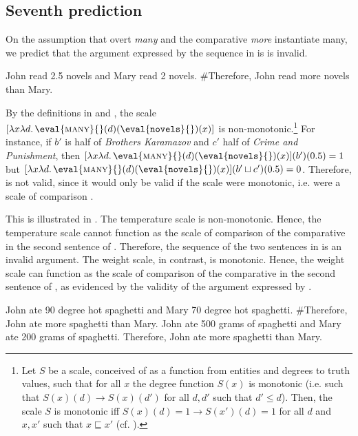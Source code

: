 \documentclass[output=paper]{langscibook}
\begin{document}
\subsection{Seventh prediction} 

On the assumption that overt \textit{many} and the comparative \textit{more} instantiate {\sc many}, we predict that the argument expressed by the sequence in  is is invalid.

\ea John read 2.5 novels and Mary read 2 novels. \#Therefore, John read more novels than Mary.\label{hai-tri:ManyComp}
\z

\noindent By the definitions in  and , the scale $[\lambda x\lambda d.\,\eval{\mbox{\sc many}}{}(d)(\eval{\mbox{\ttfamily novels}}{})(x)]$ is non-monotonic.\footnote{Let $S$ be a scale, conceived of as a function from entities and degrees to truth values, such that for all $x$ the degree function $S(x)$ is monotonic (i.e. such that $S(x)(d)\rightarrow S(x)(d')$ for all $d,d'$ such that $d'\le d$). Then, the scale $S$ is monotonic iff $S(x)(d)=1\rightarrow S(x')(d)=1$ for all $d$ and $x,x'$ such that $x\sqsubseteq x'$ (cf. \citealt{Krifka:1989,Schwarzschild:2002}).} For instance, if $b'$ is half of \textit{ Brothers Karamazov} and $c'$ half of \textit{ Crime and Punishment}, then $[\lambda x\lambda d.\,\eval{\mbox{\sc many}}{}(d)(\eval{\mbox{\ttfamily novels}}{})(x)](b')(0.5)=1$ but $[\lambda x\lambda d.\,\eval{\mbox{\sc many}}{}(d)(\eval{\mbox{\ttfamily novels}}{})(x)](b'\sqcup c')(0.5)=0$. Therefore,  is not valid, since it would only be valid if the scale were monotonic, i.e. were a scale of comparison \citep{WellwoodEtAl:2012}. 

This is illustrated in . The temperature scale is non-monotonic. Hence, the temperature scale cannot function as the scale of comparison of the comparative in the second sentence of . Therefore, the sequence of the two sentences in  is an invalid argument. The weight scale, in contrast, is monotonic.  Hence, the weight scale can function as the scale of comparison of the comparative in the second sentence of , as evidenced by the validity of the argument expressed by .

\ea \label{hai-tri:non-mon}
\ea John ate 90 degree hot spaghetti and Mary 70 degree hot spaghetti. \#Therefore, John ate more spaghetti than Mary. \label{hai-tri:non-mon-a}
\ex John ate 500 grams of spaghetti and Mary ate 200 grams of spaghetti. Therefore, John ate more spaghetti than Mary. \label{hai-tri:non-mon-b}
\z
\z
\end{document}
